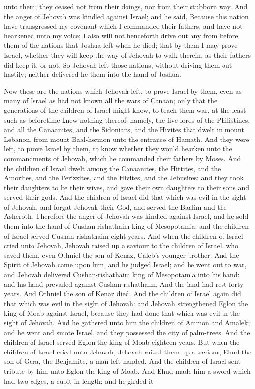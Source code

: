 unto them; they ceased not from their doings, nor from their stubborn way. And the anger of Jehovah was kindled against Israel; and he said, Because this nation have transgressed my covenant which I commanded their fathers, and have not hearkened unto my voice; I also will not henceforth drive out any from before them of the nations that Joshua left when he died; that by them I may prove Israel, whether they will keep the way of Jehovah to walk therein, as their fathers did keep it, or not. So Jehovah left those nations, without driving them out hastily; neither delivered he them into the hand of Joshua. 

Now these are the nations which Jehovah left, to prove Israel by them, even as many of Israel as had not known all the wars of Canaan; only that the generations of the children of Israel might know, to teach them war, at the least such as beforetime knew nothing thereof: namely, the five lords of the Philistines, and all the Canaanites, and the Sidonians, and the Hivites that dwelt in mount Lebanon, from mount Baal-hermon unto the entrance of Hamath. And they were left, to prove Israel by them, to know whether they would hearken unto the commandments of Jehovah, which he commanded their fathers by Moses. And the children of Israel dwelt among the Canaanites, the Hittites, and the Amorites, and the Perizzites, and the Hivites, and the Jebusites: and they took their daughters to be their wives, and gave their own daughters to their sons and served their gods.  And the children of Israel did that which was evil in the sight of Jehovah, and forgat Jehovah their God, and served the Baalim and the Asheroth. Therefore the anger of Jehovah was kindled against Israel, and he sold them into the hand of Cushan-rishathaim king of Mesopotamia: and the children of Israel served Cushan-rishathaim eight years. And when the children of Israel cried unto Jehovah, Jehovah raised up a saviour to the children of Israel, who saved them, even Othniel the son of Kenaz, Caleb’s younger brother. And the Spirit of Jehovah came upon him, and he judged Israel; and he went out to war, and Jehovah delivered Cushan-rishathaim king of Mesopotamia into his hand: and his hand prevailed against Cushan-rishathaim. And the land had rest forty years. And Othniel the son of Kenaz died.  And the children of Israel again did that which was evil in the sight of Jehovah: and Jehovah strengthened Eglon the king of Moab against Israel, because they had done that which was evil in the sight of Jehovah. And he gathered unto him the children of Ammon and Amalek; and he went and smote Israel, and they possessed the city of palm-trees. And the children of Israel served Eglon the king of Moab eighteen years.  But when the children of Israel cried unto Jehovah, Jehovah raised them up a saviour, Ehud the son of Gera, the Benjamite, a man left-handed. And the children of Israel sent tribute by him unto Eglon the king of Moab. And Ehud made him a sword which had two edges, a cubit in length; and he girded it 